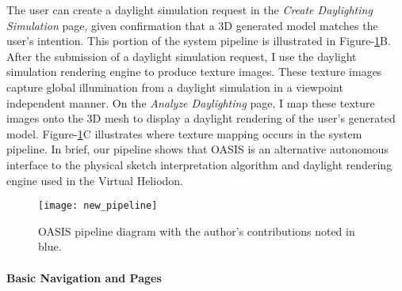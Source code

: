 The user can create a daylight simulation request in the \textit{Create Daylighting Simulation} page, given confirmation that a 3D generated model matches the user's intention.
This portion of the system pipeline is illustrated in Figure-\ref{fig:new_pipeline}B.
After the submission of a daylight simulation request, I use the daylight simulation rendering engine to produce texture images.
These texture images capture global illumination from a daylight simulation in a viewpoint independent manner.
On the \textit{Analyze Daylighting} page, I map these texture images onto the 3D mesh to display a daylight rendering of the user's generated model.
Figure-\ref{fig:new_pipeline}C illustrates where texture mapping occurs in the system pipeline.
In brief, our pipeline shows that OASIS is an alternative autonomous interface to the physical sketch interpretation algorithm and daylight rendering engine used in the Virtual Heliodon.

\begin{figure}[h]
\centering
\texttt{[image: new\_pipeline]}
\caption{OASIS pipeline diagram with the author's contributions noted in blue.}
\label{fig:new_pipeline}
\end{figure}

\paragraph{Basic Navigation and Pages}


